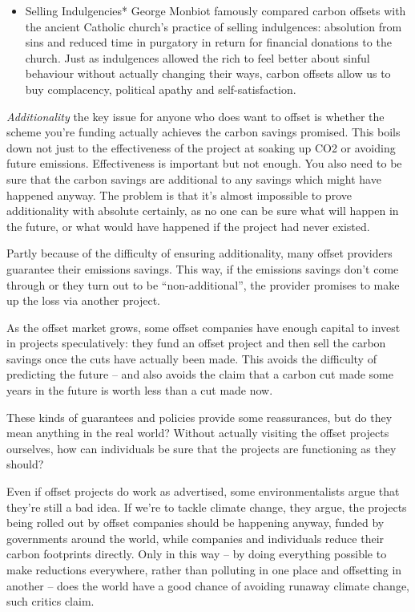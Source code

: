 \documentclass[
]{book}
\providecommand{\tightlist}{%
  \setlength{\itemsep}{0pt}\setlength{\parskip}{0pt}}
\begin{document}
\begin{itemize}
\tightlist
\item
  Selling Indulgencies*
  George Monbiot famously compared carbon offsets with the ancient Catholic church's practice of selling indulgences: absolution from sins and reduced time in purgatory in return for financial donations to the church.
  Just as indulgences allowed the rich to feel better about sinful behaviour without actually changing their ways, carbon offsets allow us to buy complacency, political apathy and self-satisfaction.
\end{itemize}

\emph{Additionality}
the key issue for anyone who does want to offset is whether the scheme you're funding actually achieves the carbon savings promised. This boils down not just to the effectiveness of the project at soaking up CO2 or avoiding future emissions. Effectiveness is important but not enough. You also need to be sure that the carbon savings are additional to any savings which might have happened anyway.
The problem is that it's almost impossible to prove additionality with absolute certainly, as no one can be sure what will happen in the future, or what would have happened if the project had never existed.

Partly because of the difficulty of ensuring additionality, many offset providers guarantee their emissions savings. This way, if the emissions savings don't come through or they turn out to be ``non-additional'', the provider promises to make up the loss via another project.

As the offset market grows, some offset companies have enough capital to invest in projects speculatively: they fund an offset project and then sell the carbon savings once the cuts have actually been made. This avoids the difficulty of predicting the future -- and also avoids the claim that a carbon cut made some years in the future is worth less than a cut made now.

These kinds of guarantees and policies provide some reassurances, but do they mean anything in the real world? Without actually visiting the offset projects ourselves, how can individuals be sure that the projects are functioning as they should?

Even if offset projects do work as advertised, some environmentalists argue that they're still a bad idea. If we're to tackle climate change, they argue, the projects being rolled out by offset companies should be happening anyway, funded by governments around the world, while companies and individuals reduce their carbon footprints directly. Only in this way -- by doing everything possible to make reductions everywhere, rather than polluting in one place and offsetting in another -- does the world have a good chance of avoiding runaway climate change, such critics claim.
\end{document}
